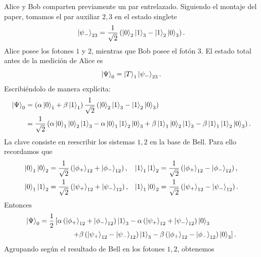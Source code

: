 \documentclass[../main.tex]{subfiles}
\begin{document}
Alice y Bob comparten previamente un par entrelazado. Siguiendo el montaje del paper, tomamos el par auxiliar $2,3$ en el estado singlete
\begin{equation*}
    \ket{\psi_-}_{23}
    =\frac{1}{\sqrt{2}}
    \left(
        \ket{0}_2\ket{1}_3-
        \ket{1}_2\ket{0}_3
    \right).
\end{equation*}
Alice posee los fotones $1$ y $2$, mientras que Bob posee el fotón $3$. El estado total antes de la medición de Alice es
\begin{equation*}
    \ket{\Psi}_0
    =\ket{T}_1\ket{\psi_-}_{23}.
\end{equation*}
Escribiéndolo de manera explícita:
\begin{align*}
    \ket{\Psi}_0
    &=
    \left(
        \alpha\ket{0}_1+\beta\ket{1}_1
    \right)
    \frac{1}{\sqrt{2}}
    \left(
        \ket{0}_2\ket{1}_3-
        \ket{1}_2\ket{0}_3
    \right)\notag\\
    &=
    \frac{1}{\sqrt{2}}
    \left(
        \alpha\ket{0}_1\ket{0}_2\ket{1}_3
        -\alpha\ket{0}_1\ket{1}_2\ket{0}_3
        +\beta\ket{1}_1\ket{0}_2\ket{1}_3
        -\beta\ket{1}_1\ket{1}_2\ket{0}_3
    \right).
\end{align*}
La clave consiste en reescribir los sistemas $1,2$ en la base de Bell. Para ello recordamos que
\begin{align*}
    \ket{0}_1\ket{0}_2
    &=\frac{1}{\sqrt{2}}
    \left(\ket{\phi_+}_{12}+\ket{\phi_-}_{12}\right),
    &
    \ket{1}_1\ket{1}_2
    &=\frac{1}{\sqrt{2}}
    \left(\ket{\phi_+}_{12}-\ket{\phi_-}_{12}\right),\\
    \ket{0}_1\ket{1}_2
    &=\frac{1}{\sqrt{2}}
    \left(\ket{\psi_+}_{12}+\ket{\psi_-}_{12}\right),
    &
    \ket{1}_1\ket{0}_2
    &=\frac{1}{\sqrt{2}}
    \left(\ket{\psi_+}_{12}-\ket{\psi_-}_{12}\right).
\end{align*}
Entonces
\begin{align*}
    \ket{\Psi}_0
    &=\frac{1}{2}
    \left[
        \alpha
        \left(\ket{\phi_+}_{12}+\ket{\phi_-}_{12}\right)
        \ket{1}_3
        -\alpha
        \left(\ket{\psi_+}_{12}+\ket{\psi_-}_{12}\right)
        \ket{0}_3
    \right.\\
    &\hspace{1.6cm}
    \left.
        +\beta
        \left(\ket{\psi_+}_{12}-\ket{\psi_-}_{12}\right)
        \ket{1}_3
        -\beta
        \left(\ket{\phi_+}_{12}-\ket{\phi_-}_{12}\right)
        \ket{0}_3
    \right].
\end{align*}
Agrupando según el resultado de Bell en los fotones $1,2$, obtenemos
\end{document}
